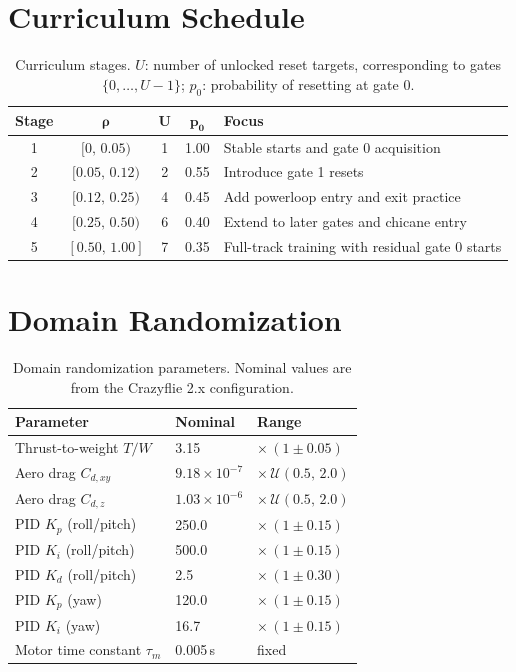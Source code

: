 \documentclass[conference]{IEEEtran}
\begin{document}
\newpage
\appendix
\section{Curriculum Schedule}

\begin{table}[h]
\centering
\caption{Curriculum stages. $U$: number of unlocked reset targets, corresponding to gates $\{0,\dots,U-1\}$; $p_0$: probability of resetting at gate 0.}
\label{tab:curriculum}
\begin{tabular}{@{}ccccl@{}}
\toprule
\textbf{Stage} & $\bm{\rho}$ & $\bm{U}$ & $\bm{p_0}$ & \textbf{Focus} \\
\midrule
1 & $[0,\, 0.05)$ & 1 & 1.00 & Stable starts and gate 0 acquisition \\
2 & $[0.05,\, 0.12)$ & 2 & 0.55 & Introduce gate 1 resets \\
3 & $[0.12,\, 0.25)$ & 4 & 0.45 & Add powerloop entry and exit practice \\
4 & $[0.25,\, 0.50)$ & 6 & 0.40 & Extend to later gates and chicane entry \\
5 & $[0.50,\, 1.00]$ & 7 & 0.35 & Full-track training with residual gate 0 starts \\
\bottomrule
\end{tabular}
\end{table}

\section{Domain Randomization}

\begin{table}[h]
\centering
\caption{Domain randomization parameters. Nominal values are from the Crazyflie 2.x configuration.}
\label{tab:domrand}
\begin{tabular}{@{}lll@{}}
\toprule
\textbf{Parameter} & \textbf{Nominal} & \textbf{Range} \\
\midrule
Thrust-to-weight $T\!/\!W$ & 3.15 & $\times\,(1 \pm 0.05)$ \\
Aero drag $C_{d,xy}$ & $9.18\!\times\!10^{-7}$ & $\times\,\mathcal{U}(0.5,\,2.0)$ \\
Aero drag $C_{d,z}$ & $1.03\!\times\!10^{-6}$ & $\times\,\mathcal{U}(0.5,\,2.0)$ \\
PID $K_p$ (roll/pitch) & 250.0 & $\times\,(1 \pm 0.15)$ \\
PID $K_i$ (roll/pitch) & 500.0 & $\times\,(1 \pm 0.15)$ \\
PID $K_d$ (roll/pitch) & 2.5 & $\times\,(1 \pm 0.30)$ \\
PID $K_p$ (yaw) & 120.0 & $\times\,(1 \pm 0.15)$ \\
PID $K_i$ (yaw) & 16.7 & $\times\,(1 \pm 0.15)$ \\
Motor time constant $\tau_m$ & 0.005\,s & fixed \\
\bottomrule
\end{tabular}
\end{table}
\end{document}
